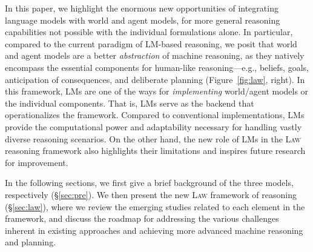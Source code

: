 \documentclass{article}
\def\modelname{\textsc{Law}\xspace}
\newcommand{\hzt}[1]{{\color{red}{[ZT: #1]}}}
\begin{document}
In this paper, we highlight the enormous new opportunities of integrating language models with world and agent models, for more general reasoning capabilities not possible with the individual formulations alone. In particular, compared to the current paradigm of LM-based reasoning, we posit that world and agent models are a better {\it abstraction} of machine reasoning, as they natively encompass the essential components for human-like reasoning---e.g., beliefs, goals, anticipation of consequences, and deliberate planning (Figure~\ref{fig:law}, right). In this framework, LMs are one of the ways for {\it implementing} world/agent models or the individual components. That is, LMs serve as the backend that operationalizes the framework. Compared to conventional implementations, LMs provide the computational power and adaptability necessary for handling vastly diverse reasoning scenarios. On the other hand, the new role of LMs in the \modelname reasoning framework also highlights their limitations and inspires future research for improvement. 

In the following sections, we first give a brief background of the three models, respectively (\S\ref{sec:pre}). We then present the new \modelname framework of reasoning (\S\ref{sec:law}), where we review the emerging studies related to each element in the framework, and discuss the roadmap for addressing the various challenges inherent in existing approaches and achieving more advanced machine reasoning and planning.









\end{document}
